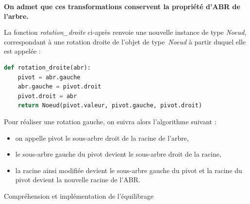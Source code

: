 \documentclass[a4paper, noanswers, addpoints, 12pt]{exam}
\begin{document}
\begin{questions}
{\centering
    
    \par}

\begin{center}
    \textbf{On admet que ces transformations conservent la propriété d'ABR de l'arbre.}
\end{center}

\newpage

La fonction \textit{rotation\_droite} ci-après renvoie une nouvelle instance de type \textit{Noeud}, correspondant à une rotation droite de l'objet de type~\textit{Noeud} à partir duquel elle est appelée :

\begin{lstlisting}[style=mystyle, language=Python]
def rotation_droite(abr):
    pivot = abr.gauche
    abr.gauche = pivot.droit
    pivot.droit = abr
    return Noeud(pivot.valeur, pivot.gauche, pivot.droit)
\end{lstlisting}


Pour réaliser une rotation gauche, on suivra alors l'algorithme suivant :
\begin{itemize}
    \item on appelle pivot le sous-arbre droit de la racine de l'arbre,
    \item le sous-arbre gauche du pivot devient le sous-arbre droit de la racine,
    \item la racine ainsi modifiée devient le sous-arbre gauche du pivot et la racine du
pivot devient la nouvelle racine de l'ABR.
\end{itemize}

\question Compréhension et implémentation de l'équilibrage


\end{questions}
\end{document}
